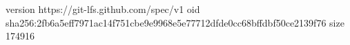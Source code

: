 version https://git-lfs.github.com/spec/v1
oid sha256:2fb6a5eff7971ac14f751cbe9e9968e5e77712dfde0cc68bffdbf50ce2139f76
size 174916
